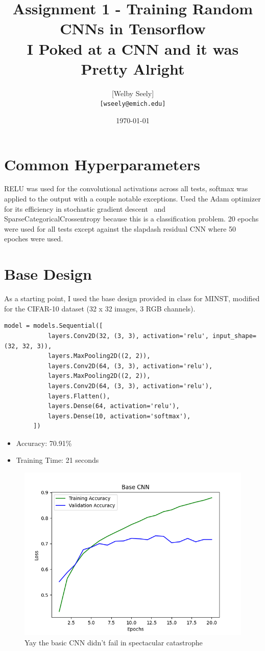 \documentclass{article}
\title{Assignment 1 - Training Random CNNs in Tensorflow \\
\large I Poked at a CNN and it was Pretty Alright}
\author{
    [Welby Seely] \\
    \texttt{[wseely@emich.edu]}
}
\date{\today}
\begin{document}
    \maketitle


    \section{Common Hyperparameters}\label{sec:preamble}

    RELU was used for the convolutional activations across all tests, softmax was applied to the output with a couple notable exceptions.
    Used the Adam optimizer for its efficiency in stochastic gradient descent~\cite{kingma2017adammethodstochasticoptimization} and SparseCategoricalCrossentropy because this is a classification problem.
    20 epochs were used for all tests except against the slapdash residual CNN where 50 epoches were used.


    \section{Base Design}\label{sec:base-design}

    As a starting point, I used the base design provided in class for MINST, modified for the CIFAR-10 dataset (32 x 32 images, 3 RGB channels).
    \\
    \begin{lstlisting}[label={lst:base_cnn}]
        model = models.Sequential([
            layers.Conv2D(32, (3, 3), activation='relu', input_shape=(32, 32, 3)),
            layers.MaxPooling2D((2, 2)),
            layers.Conv2D(64, (3, 3), activation='relu'),
            layers.MaxPooling2D((2, 2)),
            layers.Conv2D(64, (3, 3), activation='relu'),
            layers.Flatten(),
            layers.Dense(64, activation='relu'),
            layers.Dense(10, activation='softmax'),
        ])
    \end{lstlisting}

    \begin{itemize}
        \item Accuracy: 70.91\%
        \item Training Time: 21 seconds
    \end{itemize}

    \begin{figure}[!htbp]
        \centerline{\includegraphics[width=0.55\columnwidth]{Base CNN}}
        \caption{Yay the basic CNN didn't fail in spectacular catastrophe}
        \label{fig:base-cnn}
    \end{figure}
\end{document}
